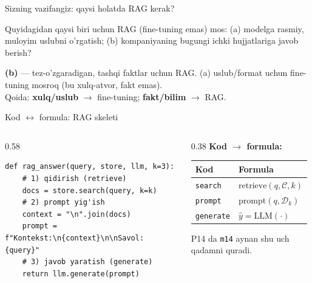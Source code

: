 \documentclass[aspectratio=169,11pt]{beamer}
\begin{document}
\begin{frame}{Sizning vazifangiz: qaysi holatda RAG kerak?}
  \begin{tcolorbox}[warnbox,title=Savol --- 60 soniya]
    \small
    Quyidagidan qaysi biri uchun RAG (fine-tuning emas) mos: (a) modelga
    rasmiy, muloyim uslubni o'rgatish; (b) kompaniyaning bugungi ichki
    hujjatlariga javob berish?
  \end{tcolorbox}
  \pause
  \begin{tcolorbox}[okbox,title=Javob]
    \small
    \textbf{(b)} --- tez-o'zgaradigan, tashqi faktlar uchun RAG. (a) uslub/format
    uchun fine-tuning mosroq (bu xulq-atvor, fakt emas).\\[3pt]
    \footnotesize Qoida: \textbf{xulq/uslub} $\to$ fine-tuning; \textbf{fakt/bilim}
    $\to$ RAG.
  \end{tcolorbox}
\end{frame}

\begin{frame}[fragile]{Kod $\leftrightarrow$ formula: RAG skeleti}
  \begin{columns}[T]
    \begin{column}{0.58\textwidth}
\begin{lstlisting}
def rag_answer(query, store, llm, k=3):
    # 1) qidirish (retrieve)
    docs = store.search(query, k=k)
    # 2) prompt yig'ish
    context = "\n".join(docs)
    prompt = f"Kontekst:\n{context}\n\nSavol: {query}"
    # 3) javob yaratish (generate)
    return llm.generate(prompt)
\end{lstlisting}
    \end{column}
    \begin{column}{0.38\textwidth}
      \textbf{Kod $\to$ formula:}\\[3pt]
      \footnotesize
      \begin{tabular}{p{1.8cm}p{2.0cm}}
        \toprule
        Kod & Formula \\
        \midrule
        \texttt{search} & $\mathrm{retrieve}(q,\mathcal{C},k)$ \\
        \texttt{prompt} & $\mathrm{prompt}(q,\mathcal{D}_k)$ \\
        \texttt{generate} & $\hat{y}=\mathrm{LLM}(\cdot)$ \\
        \bottomrule
      \end{tabular}
      \vspace{4pt}
      \begin{tcolorbox}[okbox,top=2pt,bottom=2pt]
        \footnotesize
        P14 da \texttt{m14} aynan shu uch qadamni quradi.
      \end{tcolorbox}
    \end{column}
  \end{columns}
\end{frame}
\end{document}
